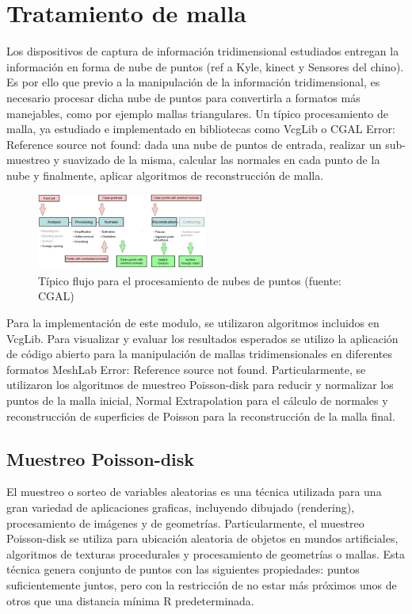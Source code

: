 \section{Tratamiento de malla}

Los dispositivos de captura de información tridimensional estudiados entregan la información en forma de nube de puntos (ref a Kyle, kinect  y Sensores del chino). Es por ello que previo a la manipulación de la información tridimensional, es necesario procesar dicha nube de puntos para convertirla a formatos más manejables, como por ejemplo mallas triangulares.
Un típico procesamiento de malla, ya estudiado e implementado en bibliotecas como VcgLib o CGAL Error: Reference source not found: dada una nube de puntos de entrada, realizar un sub-muestreo y suavizado de la misma, calcular las normales en cada punto de la nube y finalmente, aplicar algoritmos de reconstrucción de malla.

\begin{figure}[H]
  \centering
    \includegraphics[width=0.5\textwidth]{./Cap6_reconstruccion/malla-flow.png}
  \caption{Típico flujo para el procesamiento de nubes de puntos (fuente: CGAL\cite{CGAL})}
  \label{fig:Mesh-CGAL}
\end{figure}

Para la implementación de este modulo, se utilizaron algoritmos incluidos en VcgLib. Para visualizar y evaluar los resultados esperados se utilizo la aplicación de código abierto para la manipulación de mallas tridimensionales en diferentes formatos MeshLab Error: Reference source not found. Particularmente, se utilizaron los algoritmos de muestreo Poisson-disk para reducir y normalizar los puntos de la malla inicial, Normal Extrapolation para el cálculo de normales y reconstrucción de superficies de Poisson para la reconstrucción de la malla final.

\subsection{Muestreo Poisson-disk}

El muestreo o sorteo de variables aleatorias es una técnica utilizada para una gran variedad de aplicaciones graficas, incluyendo dibujado (rendering), procesamiento de imágenes y de geometrías.
Particularmente, el muestreo Poisson-disk se utiliza para ubicación aleatoria de objetos en mundos artificiales, algoritmos de texturas procedurales y procesamiento de geometrías o mallas. Esta técnica genera conjunto de puntos con las siguientes propiedades: puntos suficientemente juntos, pero con la restricción de no estar más próximos unos de otros que una distancia mínima R predeterminada.

